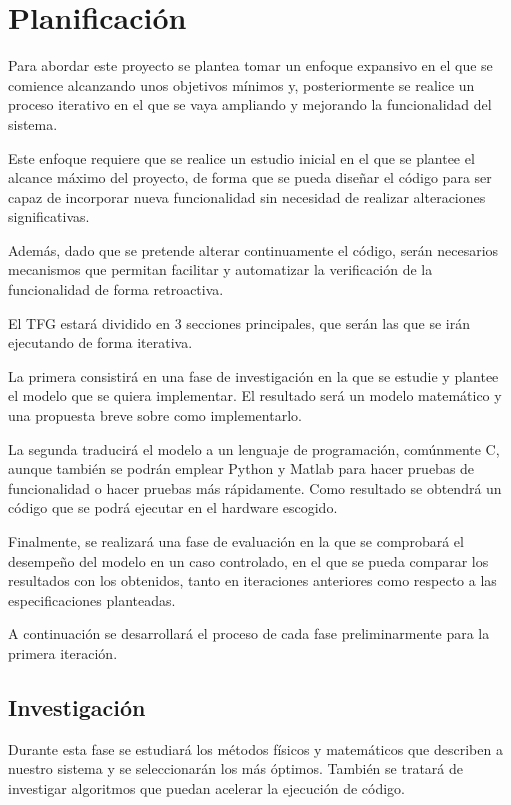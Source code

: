 \documentclass{sty/propuesta}
\begin{document}
\section{Planificación}

Para abordar este proyecto se plantea tomar un enfoque expansivo en el que se comience alcanzando unos objetivos mínimos y, posteriormente se realice un proceso iterativo en el que se vaya ampliando y mejorando la funcionalidad del sistema.

Este enfoque requiere que se realice un estudio inicial en el que se plantee el alcance máximo del proyecto, de forma que se pueda diseñar el código para ser capaz de incorporar nueva funcionalidad sin necesidad de realizar alteraciones significativas.

Además, dado que se pretende alterar continuamente el código, serán necesarios mecanismos que permitan facilitar y automatizar la verificación de la funcionalidad de forma retroactiva.

El TFG estará dividido en 3 secciones principales, que serán las que se irán ejecutando de forma iterativa.

La primera consistirá en una fase de investigación en la que se estudie y plantee el modelo que se quiera implementar. El resultado será un modelo matemático y una propuesta breve sobre como implementarlo.

La segunda traducirá el modelo a un lenguaje de programación, comúnmente C, aunque también se podrán emplear Python y Matlab para hacer pruebas de funcionalidad o hacer pruebas más rápidamente. Como resultado se obtendrá un código que se podrá ejecutar en el hardware escogido.

Finalmente, se realizará una fase de evaluación en la que se comprobará el desempeño del modelo en un caso controlado, en el que se pueda comparar los resultados con los obtenidos, tanto en iteraciones anteriores como respecto a las especificaciones planteadas.

A continuación se desarrollará el proceso de cada fase preliminarmente para la primera iteración.

\subsection{Investigación}

Durante esta fase se estudiará los métodos físicos y matemáticos que describen a nuestro sistema y se seleccionarán los más óptimos. También se tratará de investigar algoritmos que puedan acelerar la ejecución de código.
\end{document}

